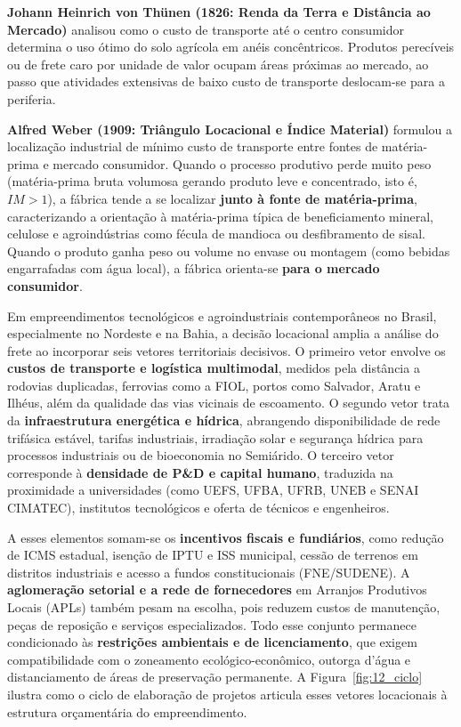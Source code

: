 \begin{boxConceito}
\textbf{Johann Heinrich von Thünen (1826: Renda da Terra e Distância ao Mercado)} analisou como o custo de transporte até o centro consumidor determina o uso ótimo do solo agrícola em anéis concêntricos. Produtos perecíveis ou de frete caro por unidade de valor ocupam áreas próximas ao mercado, ao passo que atividades extensivas de baixo custo de transporte deslocam-se para a periferia.

\textbf{Alfred Weber (1909: Triângulo Locacional e Índice Material)} formulou a localização industrial de mínimo custo de transporte entre fontes de matéria-prima e mercado consumidor. Quando o processo produtivo perde muito peso (matéria-prima bruta volumosa gerando produto leve e concentrado, isto é, $IM > 1$), a fábrica tende a se localizar \textbf{junto à fonte de matéria-prima}, caracterizando a orientação à matéria-prima típica de beneficiamento mineral, celulose e agroindústrias como fécula de mandioca ou desfibramento de sisal. Quando o produto ganha peso ou volume no envase ou montagem (como bebidas engarrafadas com água local), a fábrica orienta-se \textbf{para o mercado consumidor}.
\end{boxConceito}

Em empreendimentos tecnológicos e agroindustriais contemporâneos no Brasil, especialmente no Nordeste e na Bahia, a decisão locacional amplia a análise do frete ao incorporar seis vetores territoriais decisivos. O primeiro vetor envolve os \textbf{custos de transporte e logística multimodal}, medidos pela distância a rodovias duplicadas, ferrovias como a FIOL, portos como Salvador, Aratu e Ilhéus, além da qualidade das vias vicinais de escoamento. O segundo vetor trata da \textbf{infraestrutura energética e hídrica}, abrangendo disponibilidade de rede trifásica estável, tarifas industriais, irradiação solar e segurança hídrica para processos industriais ou de bioeconomia no Semiárido. O terceiro vetor corresponde à \textbf{densidade de P\&D e capital humano}, traduzida na proximidade a universidades (como UEFS, UFBA, UFRB, UNEB e SENAI CIMATEC), institutos tecnológicos e oferta de técnicos e engenheiros.

A esses elementos somam-se os \textbf{incentivos fiscais e fundiários}, como redução de ICMS estadual, isenção de IPTU e ISS municipal, cessão de terrenos em distritos industriais e acesso a fundos constitucionais (FNE/SUDENE). A \textbf{aglomeração setorial e a rede de fornecedores} em Arranjos Produtivos Locais (APLs) também pesam na escolha, pois reduzem custos de manutenção, peças de reposição e serviços especializados. Todo esse conjunto permanece condicionado às \textbf{restrições ambientais e de licenciamento}, que exigem compatibilidade com o zoneamento ecológico-econômico, outorga d'água e distanciamento de áreas de preservação permanente. A Figura~\ref{fig:12_ciclo} ilustra como o ciclo de elaboração de projetos articula esses vetores locacionais à estrutura orçamentária do empreendimento.

